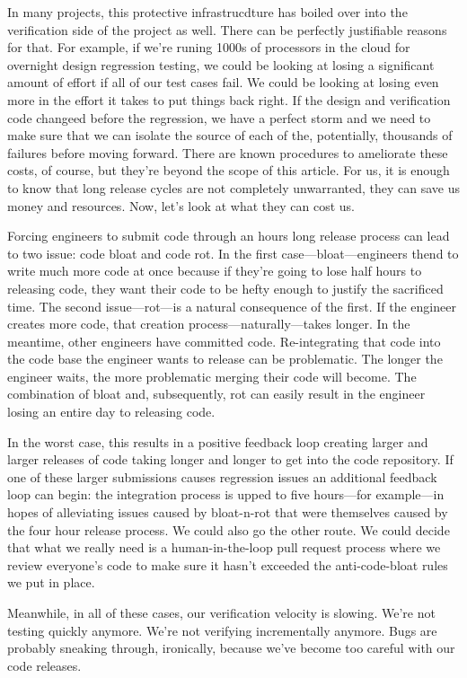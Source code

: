 \documentclass[twocolumn,letterpaper]{IEEEAerospaceCLS}  %
\begin{document}
In many projects, this protective infrastrucdture has boiled over into the verification side of the project as well. There can be perfectly justifiable reasons for that. For example, if we're runing 1000s of processors in the cloud for overnight design regression testing, we could be looking at losing a significant amount of effort if all of our test cases fail. We could be looking at losing even more in the effort it takes to put things back right. If the design and verification code changeed before the regression, we have a perfect storm and we need to make sure that we can isolate the source of each of the, potentially, thousands of failures before moving forward. There are known procedures to ameliorate these costs, of course, but they're beyond the scope of this article. For us, it is enough to know that long release cycles are not completely unwarranted, they can save us money and resources. Now, let's look at what they can cost us.

Forcing engineers to submit code through an hours long release process can lead to two issue: code bloat and code rot. In the first case—bloat—engineers thend to write much more code at once because if they're going to lose half hours to releasing code, they want their code to be hefty enough to justify the sacrificed time. The second issue—rot—is a natural consequence of the first. If the engineer creates more code, that creation process—naturally—takes longer. In the meantime, other engineers have committed code. Re-integrating that code into the code base the engineer wants to release can be problematic. The longer the engineer waits, the more problematic merging their code will become. The combination of bloat and, subsequently, rot can easily result in the engineer losing an entire day to releasing code. 

In the worst case, this results in a positive feedback loop creating larger and larger releases of code taking longer and longer to get into the code repository. If one of these larger submissions causes regression issues  an additional feedback loop can begin: the integration process is upped to five hours—for example—in hopes of alleviating issues caused by bloat-n-rot that were themselves caused by the four hour release process. We could also go the other route. We could decide that what we really need is a human-in-the-loop pull request process where we review everyone's code to make sure it hasn't exceeded the anti-code-bloat rules we put in place.

Meanwhile, in all of these cases, our verification velocity is slowing. We're not testing quickly anymore. We're not verifying incrementally anymore. Bugs are probably sneaking through, ironically, because we've become too careful with our code releases.
\end{document}
